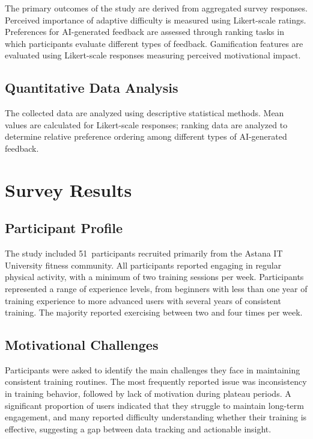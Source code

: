 \documentclass[12pt, a4paper]{report}
\begin{document}
The primary outcomes of the study are derived from aggregated survey responses. Perceived importance of adaptive difficulty is measured using Likert-scale ratings. Preferences for AI-generated feedback are assessed through ranking tasks in which participants evaluate different types of feedback. Gamification features are evaluated using Likert-scale responses measuring perceived motivational impact.

\subsection{Quantitative Data Analysis}

The collected data are analyzed using descriptive statistical methods. Mean values are calculated for Likert-scale responses; ranking data are analyzed to determine relative preference ordering among different types of AI-generated feedback.

\section{Survey Results}

\subsection{Participant Profile}

The study included 51~participants recruited primarily from the Astana IT University fitness community. All participants reported engaging in regular physical activity, with a minimum of two training sessions per week. Participants represented a range of experience levels, from beginners with less than one year of training experience to more advanced users with several years of consistent training. The majority reported exercising between two and four times per week.

\subsection{Motivational Challenges}

Participants were asked to identify the main challenges they face in maintaining consistent training routines. The most frequently reported issue was inconsistency in training behavior, followed by lack of motivation during plateau periods. A significant proportion of users indicated that they struggle to maintain long-term engagement, and many reported difficulty understanding whether their training is effective, suggesting a gap between data tracking and actionable insight.
\end{document}
